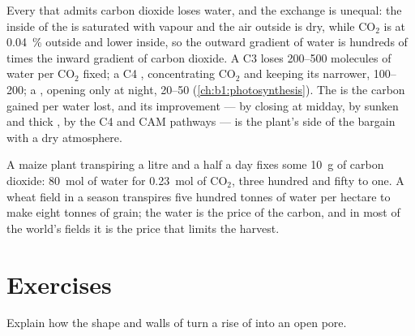 \begin{proposition}\label{prop:b1:plant-transport:wue}
Every  that admits carbon dioxide loses water, and the exchange
is unequal: the inside of the  is saturated with vapour and the
air outside is dry, while $\mathrm{CO_2}$ is at \qty{0.04}{\%} outside
and lower inside, so the outward gradient of water is hundreds of
times the inward gradient of carbon dioxide. A C3  loses
\qtyrange{200}{500}{} molecules of water per $\mathrm{CO_2}$ fixed; a
C4 , concentrating $\mathrm{CO_2}$ and keeping its 
narrower, \qtyrange{100}{200}{}; a , opening only at night,
\qtyrange{20}{50}{} (\cref{ch:b1:photosynthesis}). The
\emph{} is the carbon gained per water lost, and
its improvement --- by closing at midday, by sunken  and thick
, by the C4 and CAM pathways --- is the plant's side of the
bargain with a dry atmosphere.
\end{proposition}

\begin{example}\label{ex:b1:plant-transport:bargain}
A maize plant transpiring a litre and a half a day fixes some
\qty{10}{g} of carbon dioxide: \qty{80}{mol} of water for
\qty{0.23}{mol} of $\mathrm{CO_2}$, three hundred and fifty to one. A
wheat field in a season transpires five hundred tonnes of water per
hectare to make eight tonnes of grain; the water is the price of the
carbon, and in most of the world's fields it is the price that limits
the harvest.
\end{example}

\section{Exercises}

\begin{exercise}[$\star$]\label{exo:b1:plant-transport:1}
Explain how the shape and walls of  turn a rise of 
into an open pore.
\end{exercise}


